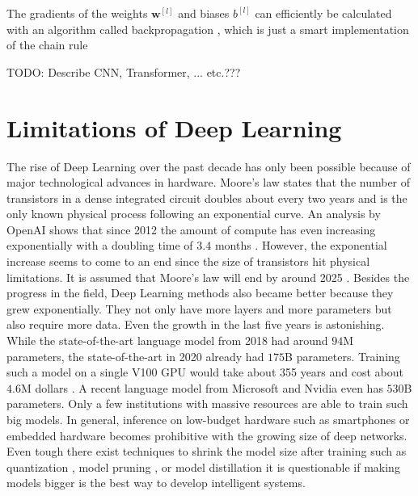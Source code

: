 The gradients of the weights \(\boldsymbol{w}^{[l]}\) and biases \(b^{[l]}\) can efficiently be calculated with an algorithm called backpropagation , which is just a smart implementation of the chain rule%

TODO: Describe CNN, Transformer, ... etc.???

\section{Limitations of Deep Learning}
The rise of Deep Learning over the past decade has only been possible because of major technological advances in hardware.
Moore’s law \cite{Moore_2006} states that the number of transistors in a dense integrated circuit doubles about every two years and is the only known physical process following an exponential curve.
An analysis by OpenAI shows that since 2012 the amount of compute has even increasing exponentially with a doubling time  of \(3.4\) months \cite{OpenAI_compute}.
However, the exponential increase seems to come to an end since the size of transistors hit physical limitations.
It is assumed that Moore's law will end by around 2025 .
Besides the progress in the field, Deep Learning methods also became better because they grew exponentially.
They not only have more layers and more parameters but also require more data.
Even the growth in the last five years is astonishing.
While the state-of-the-art language model from 2018  had around \(94\)M parameters, the state-of-the-art in 2020  already had \(175\)B parameters. Training such a model on a single V100 GPU would take about 355 years and cost about \(4.6\)M dollars \cite{Lambda_GPT3}.
A recent language model from Microsoft and Nvidia  even has \(530\)B parameters.
Only a few institutions with massive resources are able to train such big models.
In general, inference on low-budget hardware such as smartphones or embedded hardware becomes prohibitive with the growing size of deep networks.
Even tough there exist techniques to shrink the model size after training such as quantization \cite{Wu_Judd_Zhang_Isaev_Micikevicius_2020}, model pruning \cite{Choudhary_Mishra_Goswami_Sarangapani_2020}, or model distillation \cite{Hinton_Vinyals_Dean_2015} it is questionable if making models bigger is the best way to develop intelligent systems.


